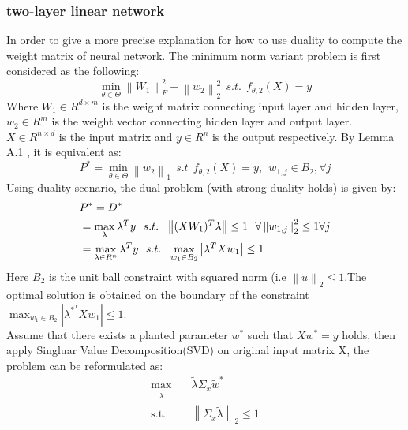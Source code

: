 \documentclass{article}
\begin{document}
\subsubsection{two-layer linear network}
In order to give a more precise explanation for how to use duality to compute the weight matrix of neural network. The minimum norm variant problem is first considered as the following:
\begin{equation}
    \min_{\theta \in \Theta } \left \| W_1 \right \|_F^2+\left \| w_2 \right \|_2^2 \ \ s.t. \ \ f_{\theta,2}(X)=y
\end{equation}
Where $W_1 \in R^{d\times m}$ is the weight matrix connecting input layer and hidden layer, $w_2\in R^m$ is the weight vector connecting hidden layer and output layer. $X\in R^{n\times d}$ is the input matrix and $y\in R^n$ is the output respectively. By Lemma A.1 \cite{cvxduality1}, it is equivalent as:
\begin{equation}
    P^*=\min_{\theta \in \Theta}\left \| w_2 \right \|_1 \ \ s.t \ \ f_{\theta,2}(X)=y,\ \ w_{1,j}\in B_2,\forall j 
\end{equation}
Using duality scenario, the dual problem (with strong duality holds) is given by:
\begin{equation}
    \begin{split}
    \centering
        &P^*=D^*\\
        &=\max_\lambda \lambda^Ty \ \ s.t. \ \ \left \| (XW_1)^T\lambda \right \| \leq 1\ \ \forall \left \|w_{1,j}\right \|_2^2\leq 1\forall j \\
        &=\max_{\lambda \in R^n} \lambda^Ty \ \ s.t. \ \ \max_{w_1 \in B_2} \left | \lambda^TXw_1 \right | \leq 1
    \end{split}
\end{equation}
Here $B_2$ is the unit ball constraint with squared norm (i.e $\left \| u \right \|_2 \leq 1$.The optimal solution is obtained on the boundary of the constraint $\max_{w_1\in B_2} \left |  \lambda^*^TXw_1\right |\leq 1$.\\
Assume that there exists a planted parameter $w^*$ such that $X w^*=y$ holds, then apply Singluar Value Decomposition(SVD) on original input matrix X, the problem can be reformulated as:
\begin{equation}
    \begin{aligned}
    \max_{\widetilde{\lambda}} \quad & \widetilde{\lambda} \Sigma _x \widetilde{w}^*\\
    \textrm{s.t.} \quad & \left \| \Sigma_x\widetilde{\lambda} \right \|_2 \leq 1 \\
    \end{aligned}
\end{equation}
\end{document}
